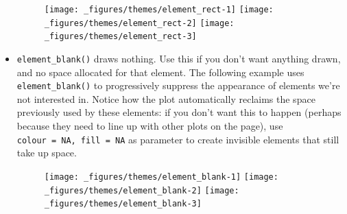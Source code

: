 \begin{itemize}
\begin{Shaded}
\begin{Highlighting}[]
\StringTok{ }\NormalTok{(} \NormalTok{(} \NormalTok{, } \NormalTok{))}
\StringTok{ }\NormalTok{(} \NormalTok{(} \NormalTok{, } \NormalTok{))}
\StringTok{ }\NormalTok{(} \NormalTok{(} \NormalTok{))}
\end{Highlighting}
\end{Shaded}

  \begin{figure}[H]
    \texttt{[image: \_figures/themes/element\_rect-1]}%
    \texttt{[image: \_figures/themes/element\_rect-2]}%
    \texttt{[image: \_figures/themes/element\_rect-3]}
  \end{figure}
\item
  \texttt{element\_blank()} draws nothing. Use this if you don't want
  anything drawn, and no space allocated for that element. The following
  example uses \texttt{element\_blank()} to progressively suppress the
  appearance of elements we're not interested in. Notice how the plot
  automatically reclaims the space previously used by these elements: if
  you don't want this to happen (perhaps because they need to line up
  with other plots on the page), use
  \texttt{colour\ =\ NA,\ fill\ =\ NA} as parameter to create invisible
  elements that still take up space. 

\begin{Shaded}
\begin{Highlighting}[]
\NormalTok{() +}\StringTok{ }\NormalTok{(} \NormalTok{())}
\NormalTok{() +}\StringTok{ }\NormalTok{(} \NormalTok{())}
\end{Highlighting}
\end{Shaded}

  \begin{figure}[H]
    \texttt{[image: \_figures/themes/element\_blank-1]}%
    \texttt{[image: \_figures/themes/element\_blank-2]}%
    \texttt{[image: \_figures/themes/element\_blank-3]}
  \end{figure}


\end{itemize}
